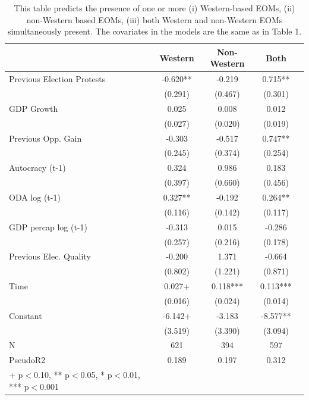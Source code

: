 \documentclass[USletter,12pt, titlepage]{article} %
\begin{document}
\begin{table}[H]
    \centering
    \begin{tabular}{l|c|c|c|c}
\hline
                  &      Western   &     Non-Western   &     Both   \\
\hline
Previous Election Protests&      -0.620** &      -0.219   &       0.715** \\
                    &     (0.291)   &     (0.467)   &     (0.301)   \\
GDP Growth          &       0.025   &       0.008   &       0.012   \\
                    &     (0.027)   &     (0.020)   &     (0.019)   \\
Previous Opp. Gain&      -0.303   &      -0.517   &       0.747** \\
                    &     (0.245)   &     (0.374)   &     (0.254)   \\
Autocracy (t-1)&       0.324   &       0.986   &       0.183   \\
                    &     (0.397)   &     (0.660)   &     (0.456)   \\
ODA log (t-1)        &       0.327** &      -0.192   &       0.264** \\
                    &     (0.116)   &     (0.142)   &     (0.117)   \\
GDP percap log (t-1) &      -0.313   &       0.015   &      -0.286   \\
                    &     (0.257)   &     (0.216)   &     (0.178)   \\
Previous Elec. Quality&      -0.200   &       1.371   &      -0.664   \\
                    &     (0.802)   &     (1.221)   &     (0.871)   \\

Time                &       0.027+  &       0.118***&       0.113***\\
                    &     (0.016)   &     (0.024)   &     (0.014)   \\
Constant            &      -6.142+  &      -3.183   &      -8.577** \\
                    &     (3.519)   &     (3.390)   &     (3.094)   \\
                    \hline
N                   &         621   &         394   &         597   \\
PseudoR2            &       0.189   &       0.197   &       0.312   \\
\hline
+ p$<$0.10, ** p$<$0.05,  * p$<$0.01, *** p$<$0.001
\end{tabular}
\vspace{0.5em}
\caption{This table predicts the presence of one or more (i) Western-based EOMs, (ii) non-Western based EOMs, (iii) both Western and non-Western EOMs simultaneously present. The covariates in the models are the same as in Table 1.}
\end{table}
\end{document}
